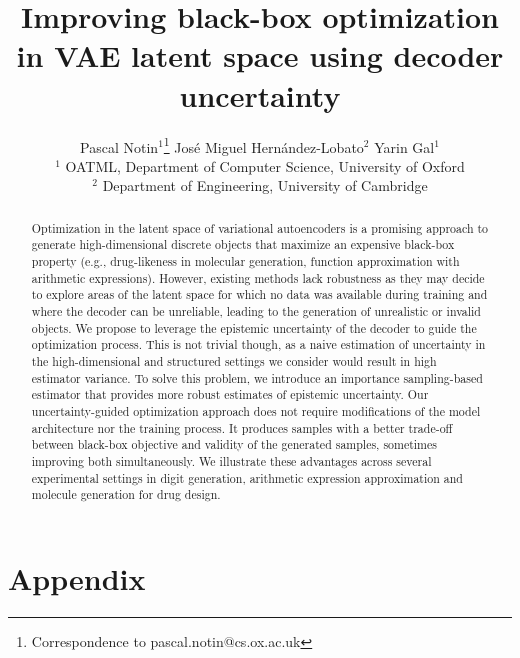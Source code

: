 \documentclass{article}
\title{Improving black-box optimization in VAE latent space using decoder uncertainty}
\author{%
  Pascal Notin$^{1}$\thanks{Correspondence to pascal.notin@cs.ox.ac.uk}
  \hfill
  José Miguel Hernández-Lobato$^{2}$
  \hfill
  Yarin Gal$^{1}$ \\[1.5em]
  $^1$ OATML, Department of Computer Science, University of Oxford \\
  $^2$ Department of Engineering, University of Cambridge \\
 
}
\begin{document}
\maketitle

\begin{abstract}
Optimization in the latent space of variational autoencoders is a promising approach to generate high-dimensional discrete objects that maximize an expensive black-box property (e.g., drug-likeness in molecular generation, function approximation with arithmetic expressions). However, existing methods lack robustness as they may decide to explore areas of the latent space for which no data was available during training and where the decoder can be unreliable, leading to the generation of unrealistic or invalid objects. We propose to leverage the epistemic uncertainty of the decoder to guide the optimization process. This is not trivial though, as a naive estimation of uncertainty in the high-dimensional and structured settings we consider would result in high estimator variance. To solve this problem, we introduce an importance sampling-based estimator that provides more robust estimates of epistemic uncertainty. Our uncertainty-guided optimization approach does not require modifications of the model architecture nor the training process. It produces samples with a better trade-off between black-box objective and validity of the generated samples, sometimes improving both simultaneously. We illustrate these advantages across several experimental settings in digit generation, arithmetic expression approximation and molecule generation for drug design.


\end{abstract}









\newpage
\small



\newpage

\appendix

\clearpage
\section*{Appendix}

\end{document}
